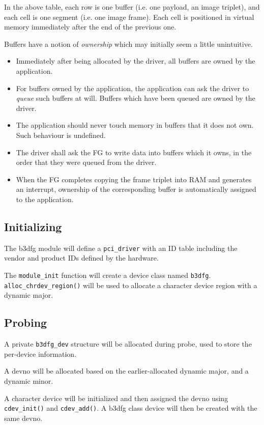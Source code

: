 \documentclass[12pt]{article}
\begin{document}
In the above table, each row is one buffer (i.e. one payload, an image triplet), and each cell is one segment (i.e. one image frame). Each cell is positioned in virtual memory immediately after the end of the previous one.

Buffers have a notion of \textit{ownership} which may initially seem a little unintuitive.
\begin{itemize}
\item Immediately after being allocated by the driver, all buffers are owned by the application.
\item For buffers owned by the application, the application can ask the driver to \textit{queue} such buffers at will. Buffers which have been queued are owned by the driver.
\item The application should never touch memory in buffers that it does not own. Such behaviour is undefined.
\item The driver shall ask the FG to write data into buffers which it owns, in the order that they were queued from the driver.
\item When the FG completes copying the frame triplet into RAM and generates an interrupt, ownership of the corresponding buffer is automatically assigned to the application.
\end{itemize}

\subsection{Initializing}

The b3dfg module will define a \texttt{pci\_driver} with an ID table including the vendor and product IDs defined by the hardware.

The \texttt{module\_init} function will create a device class named \texttt{b3dfg}. \texttt{alloc\_chrdev\_region()} will be used to allocate a character device region with a dynamic major.

\subsection{Probing}

A private \texttt{b3dfg\_dev} structure will be allocated during probe, used to store the per-device information.

A devno will be allocated based on the earlier-allocated dynamic major, and a dynamic minor.

A character device will be initialized and then assigned the devno using \texttt{cdev\_init()} and \texttt{cdev\_add()}. A b3dfg class device will then be created with the same devno.
\end{document}
